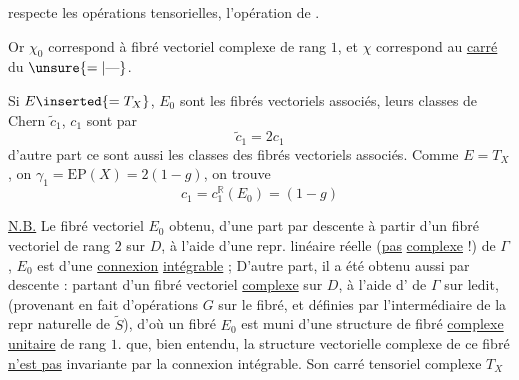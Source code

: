 respecte les opérations tensorielles, l'opération de .

Or $\chi_0$ correspond à  fibré vectoriel complexe de rang $1$, et $\chi$ correspond au \uline{carré} du $\unsure{=|\text{---}}$.

 Si $E\inserted{=T_X}$, $E_0$ sont les fibrés vectoriels  associés, leurs classes de Chern  $\widetilde c_1$, $c_1$ sont  par
\[
\widetilde c_1=2c_1
\]
d'autre part ce sont aussi les classes  des fibrés vectoriels associés. Comme  $E=T_X$, on  $\gamma_1=\mathrm{EP}(X)=2(1-g)$, on trouve
\[
c_1=c_1^{\mathbb R}(E_0)=(1-g)
\]

\uline{N.B.} Le fibré vectoriel  $E_0$   obtenu, d'une part par descente à partir d'un fibré vectoriel de rang $2$  sur $D$, à l'aide d'une repr. linéaire réelle (\uline{pas} \uline{complexe} !) de $\Gamma$,    $E_0$ est  d'une \uline{connexion} \uline{intégrable} ; D'autre part, il a été obtenu aussi par descente : partant d'un fibré vectoriel \uline{complexe} sur $D$, à l'aide d' de $\Gamma$ sur ledit, (provenant en fait d'opérations  $G$ sur le fibré, et définies par l'intermédiaire de la repr naturelle de $\widetilde S$),  d'où un fibré $E_0$ est muni d'une structure de fibré \uline{complexe} \uline{unitaire} de rang $1$.  que, bien entendu, la structure vectorielle  complexe de ce fibré \uline{n'est pas} invariante par la connexion intégrable. Son carré tensoriel complexe  $T_X$ 

